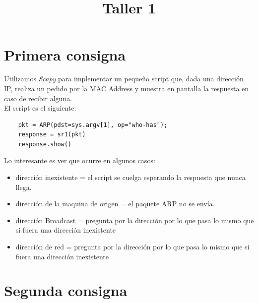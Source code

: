 \documentclass[a4paper]{article}
\title{Taller 1}
\begin{document}


\maketitle

\newpage

\tableofcontents


\beg

\newpage

\section{Primera consigna}

Utilizamos \textit{Scapy} para implementar un pequeño script que, dada una dirección IP, realiza un pedido por la MAC Address y muestra en pantalla la respuesta en caso de recibir alguna.\\

El script es el siguiente:

\begin{verbatim}
	pkt = ARP(pdst=sys.argv[1], op="who-has");
	response = sr1(pkt)
	response.show()
\end{verbatim}

Lo interesante es ver que ocurre en algunos casos:

\begin{itemize}
\item dirección inexistente = el script se cuelga esperando la respuesta que nunca llega. 
\item dirección de la maquina de origen = el paquete ARP no se envía.
\item dirección Broadcast = pregunta por la dirección por lo que pasa lo mismo que si fuera una dirección inexistente 
\item dirección de red = pregunta por la dirección por lo que pasa lo mismo que si fuera una dirección inexistente 
\end{itemize}


\section{Segunda consigna}
\end{document}

